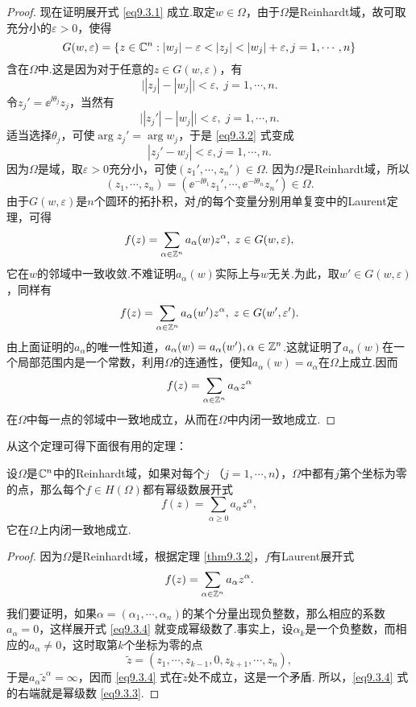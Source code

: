 \begin{proof}
  现在证明展开式 \eqref{eq9.3.1} 成立.取定$w\in\Omega$，由于$\Omega$是Reinhardt域，故可取充分小的$\varepsilon>0$，使得
  \[
    G(w,\varepsilon) = \{z\in\mathbb C^n:|w_j|-\varepsilon < |z_j| < |w_j| + \varepsilon,j=1,\cdots,n\}
  \]
  含在$\Omega$中.这是因为对于任意的$z\in G(w,\varepsilon)$，有
  \[
    \big||z_j|-|w_j|\big| < \varepsilon,\;j=1,\cdots,n.
  \]
  令$z_j'=\ee^{\ii\theta_j}z_j$，当然有
  \begin{equation}\label{eq9.3.2}
    \big||z_j'|-|w_j|\big| < \varepsilon,\;j=1,\cdots,n.
  \end{equation}
  适当选择$\theta_j$，可使$\arg z_j'=\arg w_j$，于是 \eqref{eq9.3.2} 式变成
  \[
    |z_j'-w_j| < \varepsilon, j=1,\cdots,n.
  \]
  因为$\Omega$是域，取$\varepsilon>0$充分小，可使$(z_1',\cdots,z_n')\in\Omega$. 因为$\Omega$是Reinhardt域，所以
  \[
    (z_1,\cdots,z_n) = (\ee^{-\ii\theta_1}z_1', \cdots, \ee^{-\ii\theta_n}z_n')\in\Omega.
  \]
  由于$G(w,\varepsilon)$是$n$个圆环的拓扑积，对$f$的每个变量分别用单复变中的Laurent定理，可得
  \[
    f(z) = \sum_{\alpha\in\mathbb Z^n}a_\alpha(w) z^\alpha,\;z\in G(w,\varepsilon),
  \]
  它在$w$的邻域中一致收敛.不难证明$a_\alpha(w)$实际上与$w$无关.为此，取$w'\in G(w,\varepsilon)$，同样有
  \[
    f(z) = \sum_{\alpha\in\mathbb Z^n}a_\alpha(w')z^\alpha,\;z\in G(w',\varepsilon').
  \]
  由上面证明的$a_\alpha$的唯一性知道，$a_\alpha(w)=a_\alpha(w'),\alpha\in\mathbb Z^n $.这就证明了$a_\alpha(w)$在一个局部范围内是一个常数，利用$\Omega$的连通性，便知$a_\alpha(w)=a_\alpha$在$\Omega$上成立.因而
  \[
    f(z) = \sum_{\alpha\in\mathbb Z^n}a_\alpha z^\alpha
  \]
  在$\Omega$中每一点的邻域中一致地成立，从而在$\Omega$中内闭一致地成立.
\end{proof}

从这个定理可得下面很有用的定理：
\begin{theorem}\label{thm9.3.3}
  设$\Omega$是$\mathbb C^n$中的Reinhardt域，如果对每个$j$
  （$j=1,\cdots,n$），$\Omega$中都有$j$第个坐标为零的点，那么每个$f\in H(\Omega)$都有幂级数展开式
  \begin{equation}\label{eq9.3.3}
    f(z) = \sum_{\alpha\ge0}a_\alpha z^\alpha,
  \end{equation}
  它在$\Omega$上内闭一致地成立.
\end{theorem}
\begin{proof}
  因为$\Omega$是Reinhardt域，根据定理 \ref{thm9.3.2}，$f$有Laurent展开式
  \begin{equation}\label{eq9.3.4}
    f(z) = \sum_{\alpha\in\mathbb Z^n}a_\alpha z^\alpha.
  \end{equation}
  我们要证明，如果$\alpha=(\alpha_1,\cdots,\alpha_n)$的某个分量出现负整数，那么相应的系数$a_\alpha=0$，这样展开式 \eqref{eq9.3.4} 就变成幂级数了.事实上，设$\alpha_k$是一个负整数，而相应的$a_\alpha\ne0$，这时取第$k$个坐标为零的点
  \[
    \tilde{z} = (z_1,\cdots,z_{k-1},0,z_{k+1},\cdots,z_n),
  \]
  于是$a_\alpha\tilde{z}^\alpha=\infty$，因而 \eqref{eq9.3.4} 式在$\tilde{z}$处不成立，这是一个矛盾. 所以，\eqref{eq9.3.4} 式的右端就是幂级数 \eqref{eq9.3.3}.
\end{proof}

